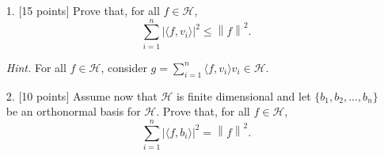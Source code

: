 \documentclass[a4paper,10.5pt]{article}
\begin{document}
\begin{itemize}
\item[1.] $[$15 points$]$ Prove that, for all $f \in \mathcal{H}$, 
$$ \sum_{ i=1 }^{n} | \langle  f, v_i \rangle |^2  \leq \left\| f \right\|^2.$$

\textit{Hint.} For all $f \in \mathcal{H}$, consider $g = \sum_{ i=1 }^{n} \langle f, v_i \rangle v_i \in \mathcal{H}$.

\item[2.] $[$10 points$]$ Assume now that $\mathcal{H}$ is finite dimensional and let $\{b_1, b_2, ..., b_n\}$ be an orthonormal basis for $\mathcal{H}$. Prove that, for all $f \in \mathcal{H}$,
$$ \sum_{ i=1 }^{n} | \langle  f, b_i \rangle |^2  = \left\| f \right\|^2.$$
\end{itemize}

 \\

 \\
\end{document}
